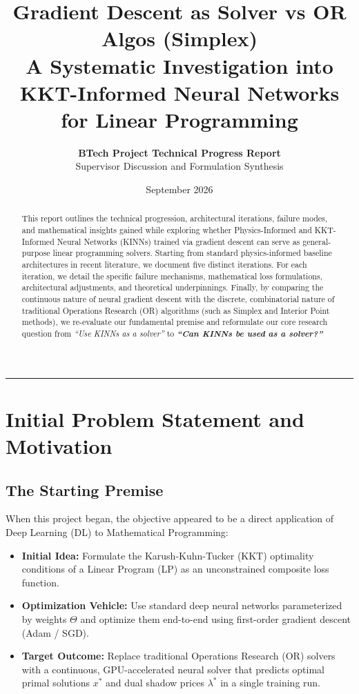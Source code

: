 \documentclass[11pt,a4paper]{article}
\title{\textbf{\LARGE Gradient Descent as Solver vs OR Algos (Simplex)}\\[0.3em]
\large A Systematic Investigation into KKT-Informed Neural Networks for Linear Programming}
\author{\textbf{BTech Project Technical Progress Report} \\ Supervisor Discussion and Formulation Synthesis}
\date{September 2026}
\begin{document}
\maketitle

\begin{abstract}
This report outlines the technical progression, architectural iterations, failure modes, and mathematical insights gained while exploring whether Physics-Informed and KKT-Informed Neural Networks (KINNs) trained via gradient descent can serve as general-purpose linear programming solvers. Starting from standard physics-informed baseline architectures in recent literature, we document five distinct iterations. For each iteration, we detail the specific failure mechanisms, mathematical loss formulations, architectural adjustments, and theoretical underpinnings. Finally, by comparing the continuous nature of neural gradient descent with the discrete, combinatorial nature of traditional Operations Research (OR) algorithms (such as Simplex and Interior Point methods), we re-evaluate our fundamental premise and reformulate our core research question from \textit{``Use KINNs as a solver''} to \textit{\textbf{``Can KINNs be used as a solver?''}}
\end{abstract}

\vspace{0.5em}
\hrule
\vspace{1.5em}

\section{Initial Problem Statement and Motivation}

\subsection{The Starting Premise}
When this project began, the objective appeared to be a direct application of Deep Learning (DL) to Mathematical Programming:
\begin{itemize}[leftmargin=1.5em, itemsep=2pt]
    \item \textbf{Initial Idea:} Formulate the Karush-Kuhn-Tucker (KKT) optimality conditions of a Linear Program (LP) as an unconstrained composite loss function.
    \item \textbf{Optimization Vehicle:} Use standard deep neural networks parameterized by weights $\Theta$ and optimize them end-to-end using first-order gradient descent (Adam / SGD).
    \item \textbf{Target Outcome:} Replace traditional Operations Research (OR) solvers with a continuous, GPU-accelerated neural solver that predicts optimal primal solutions $x^*$ and dual shadow prices $\lambda^*$ in a single training run.
\end{itemize}
\end{document}
